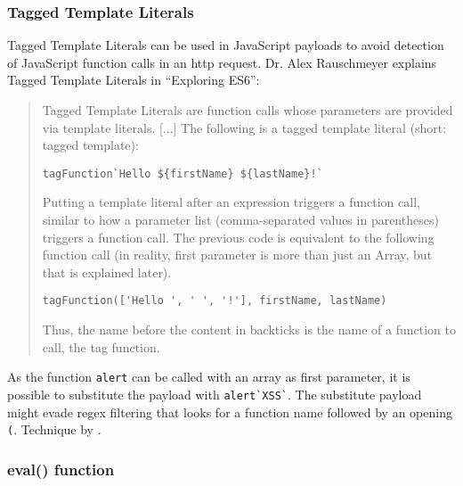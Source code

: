 \subsubsection{Tagged Template Literals}
\label{sec:taggedtemplateliterals}
Tagged Template Literals can be used in JavaScript payloads to avoid detection of JavaScript function calls in an http request. Dr. Alex Rauschmeyer explains Tagged Template Literals in ``Exploring ES6'':
\begin{quotation} Tagged Template Literals are function calls whose parameters are provided via template literals. [...]
	The following is a tagged template literal (short: tagged template):
	\begin{lstlisting}
tagFunction`Hello ${firstName} ${lastName}!`
\end{lstlisting}
	Putting a template literal after an expression triggers a function call, similar to how a parameter list (comma-separated values in parentheses) triggers a function call. The previous code is equivalent to the following function call (in reality, first parameter is more than just an Array, but that is explained later).
	\begin{lstlisting}
tagFunction(['Hello ', ' ', '!'], firstName, lastName)
\end{lstlisting}
	Thus, the name before the content in backticks is the name of a function to call, the tag function.
	\cite{exploringes6/templatelit}
\end{quotation}

As the function \verb|alert| can be called with an array as first parameter, it is possible to substitute the payload with \verb|alert`XSS`|. The substitute payload might evade regex filtering that looks for a function name followed by an opening \verb|(|.
Technique by \cite{onecons/wafbypass}.


\subsubsection{eval() function}
\label{sec:eval}

